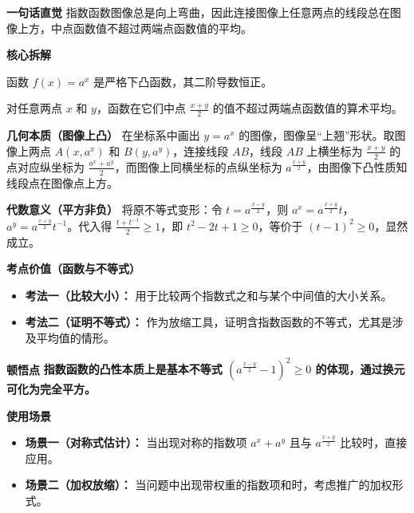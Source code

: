 \begin{explanationbox}
\textbf{\textcolor{CExplanation}{一句话直觉}}
指数函数图像总是向上弯曲，因此连接图像上任意两点的线段总在图像上方，中点函数值不超过两端点函数值的平均。

\medskip
\textbf{\textcolor{CExplanation}{核心拆解}}
\begin{description}[style=nextline, leftmargin=2.8em, labelsep=0.5em, itemsep=0.45em]
    \item[\textbf{要点一（下凸函数）：}] 函数 $f(x)=a^{x}$ 是严格下凸函数，其二阶导数恒正。
    \item[\textbf{要点二（中点估计）：}] 对任意两点 $x$ 和 $y$，函数在它们中点 $\frac{x+y}{2}$ 的值不超过两端点函数值的算术平均。
\end{description}

\medskip
\textbf{\textcolor{CExplanation}{几何本质（图像上凸）}}
在坐标系中画出 $y=a^{x}$ 的图像，图像呈“上翘”形状。取图像上两点 $A(x,a^{x})$ 和 $B(y,a^{y})$，连接线段 $AB$，线段 $AB$ 上横坐标为 $\frac{x+y}{2}$ 的点对应纵坐标为 $\frac{a^{x}+a^{y}}{2}$，而图像上同横坐标的点纵坐标为 $a^{\frac{x+y}{2}}$，由图像下凸性质知线段点在图像点上方。

\medskip
\textbf{\textcolor{CExplanation}{代数意义（平方非负）}}
将原不等式变形：令 $t = a^{\frac{x-y}{2}}$，则 $a^{x}=a^{\frac{x+y}{2}} t$，$a^{y}=a^{\frac{x+y}{2}} t^{-1}$。代入得 $\frac{t+t^{-1}}{2} \geq 1$，即 $t^2-2t+1 \geq 0$，等价于 $(t-1)^2 \geq 0$，显然成立。

\medskip
\textbf{\textcolor{CExplanation}{考点价值（函数与不等式）}}
\begin{itemize}[leftmargin=*, itemsep=0.5em, topsep=0.4em]
    \item \textbf{考法一（比较大小）：} 用于比较两个指数式之和与某个中间值的大小关系。
    \item \textbf{考法二（证明不等式）：} 作为放缩工具，证明含指数函数的不等式，尤其是涉及平均值的情形。
\end{itemize}

\medskip
\textbf{\textcolor{CExplanation}{顿悟点}}
\textbf{指数函数的凸性本质上是基本不等式 $(a^{\frac{x-y}{2}}-1)^2 \geq 0$ 的体现，通过换元可化为完全平方。}

\medskip
\textbf{\textcolor{CExplanation}{使用场景}}
\begin{itemize}[leftmargin=*, itemsep=0.5em, topsep=0.4em]
    \item \textbf{场景一（对称式估计）：} 当出现对称的指数项 $a^{x}+a^{y}$ 且与 $a^{\frac{x+y}{2}}$ 比较时，直接应用。
    \item \textbf{场景二（加权放缩）：} 当问题中出现带权重的指数项和时，考虑推广的加权形式。
\end{itemize}
\end{explanationbox}
